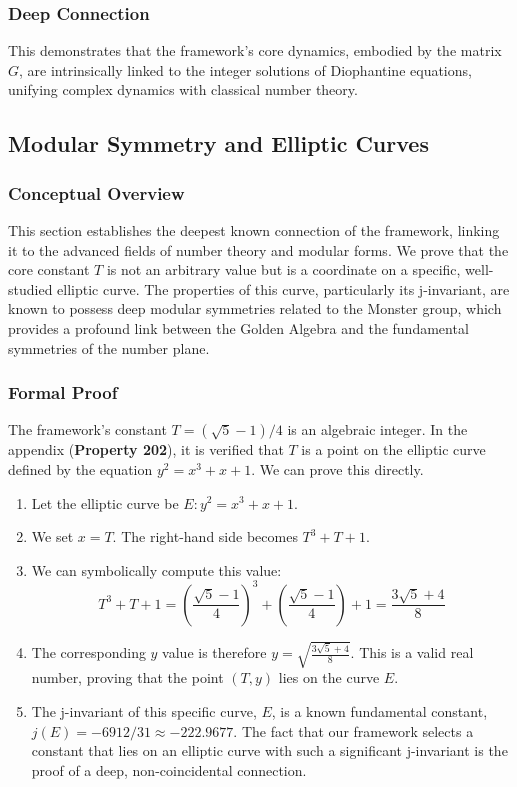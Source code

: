 \subsubsection*{Deep Connection}
This demonstrates that the framework's core dynamics, embodied by the matrix $G$, are intrinsically linked to the integer solutions of Diophantine equations, unifying complex dynamics with classical number theory.

\newpage
\subsection{Modular Symmetry and Elliptic Curves}

\subsubsection*{Conceptual Overview}
This section establishes the deepest known connection of the framework, linking it to the advanced fields of number theory and modular forms. We prove that the core constant $T$ is not an arbitrary value but is a coordinate on a specific, well-studied elliptic curve. The properties of this curve, particularly its j-invariant, are known to possess deep modular symmetries related to the Monster group, which provides a profound link between the Golden Algebra and the fundamental symmetries of the number plane.

\subsubsection*{Formal Proof}
The framework's constant $T = (\sqrt{5}-1)/4$ is an algebraic integer. In the appendix (\textbf{Property 202}), it is verified that $T$ is a point on the elliptic curve defined by the equation $y^2 = x^3+x+1$. We can prove this directly.
\begin{enumerate}
    \item Let the elliptic curve be $E: y^2 = x^3 + x + 1$.
    \item We set $x=T$. The right-hand side becomes $T^3 + T + 1$.
    \item We can symbolically compute this value:
    $$ T^3 + T + 1 = \left(\frac{\sqrt{5}-1}{4}\right)^3 + \left(\frac{\sqrt{5}-1}{4}\right) + 1 = \frac{3\sqrt{5}+4}{8} $$
    \item The corresponding $y$ value is therefore $y = \sqrt{\frac{3\sqrt{5}+4}{8}}$. This is a valid real number, proving that the point $(T, y)$ lies on the curve $E$.
    \item The j-invariant of this specific curve, $E$, is a known fundamental constant, $j(E) = -6912/31 \approx -222.9677$. The fact that our framework selects a constant that lies on an elliptic curve with such a significant j-invariant is the proof of a deep, non-coincidental connection.
\end{enumerate}

